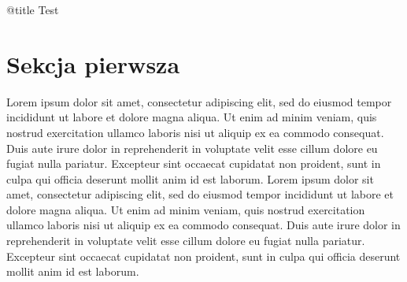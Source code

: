 \documentclass{article}
\begin{document}
@title Test 
\section{Sekcja pierwsza}
Lorem ipsum dolor sit amet, consectetur adipiscing elit, sed do eiusmod tempor incididunt ut labore et dolore magna aliqua. Ut enim ad minim veniam, quis nostrud exercitation ullamco laboris nisi ut aliquip ex ea commodo consequat. Duis aute irure dolor in reprehenderit in voluptate velit esse cillum dolore eu fugiat nulla pariatur. Excepteur sint occaecat cupidatat non proident, sunt in culpa qui officia deserunt mollit anim id est laborum. Lorem ipsum dolor sit amet, consectetur adipiscing elit, sed do eiusmod tempor incididunt ut labore et dolore magna aliqua. Ut enim ad minim veniam, quis nostrud exercitation ullamco laboris nisi ut aliquip ex ea commodo consequat. Duis aute irure dolor in reprehenderit in voluptate velit esse cillum dolore eu fugiat nulla pariatur. Excepteur sint occaecat cupidatat non proident, sunt in culpa qui officia deserunt mollit anim id est laborum. 
\end{document}
